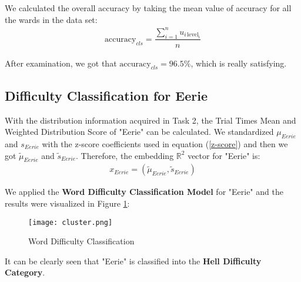 We calculated the overall accuracy by taking the mean value of accuracy for all the wards in the data set:
\begin{align}
    \mathrm{accuracy}_{cls}=\dfrac{\sum\limits_{i=1}^{n}u_{i\,\mathrm{level_{i}}}}{n}
\end{align}

After examination, we got that $\mathrm{accuracy}_{cls}=96.5\%$, which is really satisfying.
\subsection{Difficulty Classification for Eerie}
With the distribution information acquired in Task 2, the Trial Times Mean and Weighted Distribution Score of "Eerie" can be calculated. We standardized $\mu_{Eerie}$ and $s_{Eerie}$ with the z-score coefficients used in equation (\ref{z-score}) and then we got $\tilde{\mu}_{Eerie}$ and $\tilde{s}_{Eerie}$. Therefore, the embedding $\mathbb{R}^{2}$ vector for "Eerie" is:
\begin{align}
    x_{Eerie}=(\tilde{\mu}_{Eerie},\tilde{s}_{Eerie})
\end{align}

We applied the \textbf{Word Difficulty Classification Model} for "Eerie" and the results were visualized in Figure \ref{cluster}:

\begin{figure}[h]
    \centering
    \texttt{[image: cluster.png]}
    \caption{Word Difficulty Classification}
    \label{cluster}
\end{figure}

It can be clearly seen that "Eerie" is classified into the \textbf{Hell Difficulty Category}.
